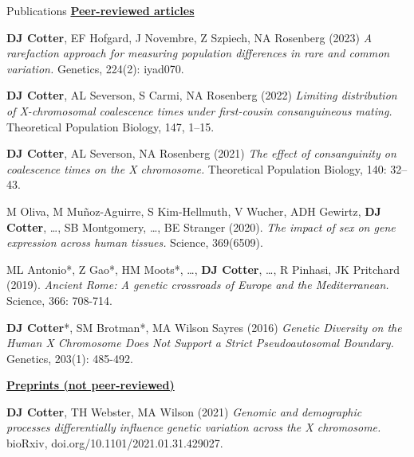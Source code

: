 \documentclass[]{kyvernitis-resume}
\begin{document}
\begin{section}{Publications}
\vspace{1mm}
\textbf{\underline{Peer-reviewed articles}}
\item \textbf{DJ Cotter}, EF Hofgard, J Novembre, Z Szpiech, NA Rosenberg (2023) \textit{A rarefaction approach for measuring population differences in rare and common variation.} Genetics, 224(2): iyad070.
\item \textbf{DJ Cotter}, AL Severson, S Carmi, NA Rosenberg (2022) \textit{Limiting distribution of X-chromosomal coalescence times under first-cousin consanguineous mating.} Theoretical Population Biology, 147, 1--15.
\item \textbf{DJ Cotter}, AL Severson, NA Rosenberg (2021) \textit{The effect of consanguinity on coalescence times on the X chromosome.} Theoretical Population Biology, 140: 32--43.
\item M Oliva, M Muñoz-Aguirre, S Kim-Hellmuth, V Wucher, ADH Gewirtz, \textbf{DJ Cotter}, \dots, SB Montgomery, \dots, BE Stranger (2020). \textit{The impact of sex on gene expression across human tissues.} Science, 369(6509).
\item ML Antonio*, Z Gao*, HM Moots*, \dots, \textbf{DJ Cotter}, \dots, R Pinhasi, JK Pritchard (2019). \textit{Ancient Rome: A genetic crossroads of Europe and the Mediterranean.} Science, 366: 708-714.
\item \textbf{DJ Cotter}*, SM Brotman*, MA Wilson Sayres (2016) \textit{Genetic Diversity on the Human X Chromosome Does Not Support a Strict Pseudoautosomal Boundary.} Genetics, 203(1): 485-492.


\textbf{\underline{Preprints (not peer-reviewed)}}
\item \textbf{DJ Cotter}, TH Webster, MA Wilson (2021) \textit{Genomic and demographic processes differentially influence genetic variation across the X chromosome.} bioRxiv, doi.org/10.1101/2021.01.31.429027.
\end{section}

\end{document}
